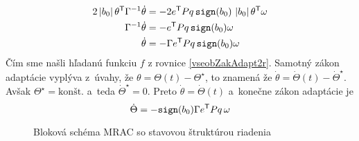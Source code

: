 \documentclass[a4paper, 10pt, ]{article}
\begin{document}
\begin{subequations}
    \begin{align}
        2 \left| b_0 \right| \theta^{\mathsf{T}} \Gamma^{-1} \dot \theta &= - 2 e^{\mathsf{T}} P q \, \texttt{sign}(b_0) \, \left| b_0 \right| \theta^{\mathsf{T}} \omega \\
        \Gamma^{-1} \dot \theta &= - e^{\mathsf{T}} P q \, \texttt{sign}(b_0) \omega \\
        \dot \theta &= - \Gamma e^{\mathsf{T}} P q \, \texttt{sign}(b_0) \omega
    \end{align}
\end{subequations}
Čím sme našli hľadanú funkciu $f$ z rovnice \eqref{vseobZakAdapt2r}. Samotný zákon adaptácie vyplýva z~úvahy, že $\theta = \Theta(t) - \Theta^\star$, to znamená že $\dot \theta = \dot \Theta(t) - \dot \Theta^\star$. Avšak $\Theta^\star = \textrm{konšt.}$ a~teda $\dot \Theta^\star = 0$. Preto $\dot \theta = \dot \Theta(t)$ a~konečne zákon adaptácie je
\begin{equation}
    \dot \Theta = - \texttt{sign}(b_0) \Gamma e^{\mathsf{T}} P q \, \omega
\end{equation}





\begin{figure}[t]
	\centering
	\caption{Bloková schéma MRAC so stavovou štruktúrou riadenia} \label{Bloková schéma MRAC so stavovou štruktúrou riadenia}
\end{figure}
\end{document}
